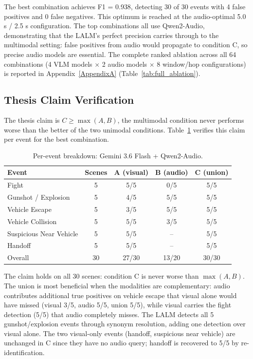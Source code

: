 The best combination achieves F1 = 0.938, detecting 30 of 30 events with 4 false positives and 0 false negatives. This optimum is reached at the audio-optimal 5.0 s / 2.5 s configuration. The top combinations all use Qwen2-Audio, demonstrating that the LALM's perfect precision carries through to the multimodal setting: false positives from audio would propagate to condition C, so precise audio models are essential. The complete ranked ablation across all 64 combinations (4 VLM models $\times$ 2 audio models $\times$ 8 window/hop configurations) is reported in Appendix~\ref{AppendixA} (Table~\ref{tab:full_ablation}).

\subsection{Thesis Claim Verification}

The thesis claim is $C \ge \max(A, B)$, the multimodal condition never performs worse than the better of the two unimodal conditions. Table~\ref{tab:thesis_claim} verifies this claim per event for the best combination.

\begin{table}[h]
  \centering
  \caption{Per-event breakdown: Gemini 3.6 Flash + Qwen2-Audio.}
  \label{tab:thesis_claim}
  \begin{tabular}{lcccc}
    \toprule
    Event & Scenes & A (visual) & B (audio) & C (union) \\
    \midrule
    Fight & 5 & 5/5 & 0/5 & 5/5 \\
    Gunshot / Explosion & 5 & 4/5 & 5/5 & 5/5 \\
    Vehicle Escape & 5 & 3/5 & 5/5 & 5/5 \\
    Vehicle Collision & 5 & 5/5 & 3/5 & 5/5 \\
     Suspicious Near Vehicle & 5 & 5/5 & -- & 5/5 \\
     Handoff & 5 & 5/5 & -- & 5/5 \\
     \midrule
     Overall & 30 & 27/30 & 13/20 & 30/30 \\
    \bottomrule
  \end{tabular}
\end{table}

The claim holds on all 30 scenes: condition C is never worse than $\max(A, B)$. The union is most beneficial when the modalities are complementary: audio contributes additional true positives on vehicle escape that visual alone would have missed (visual 3/5, audio 5/5, union 5/5), while visual carries the fight detection (5/5) that audio completely misses. The LALM detects all 5 gunshot/explosion events through synonym resolution, adding one detection over visual alone. The two visual-only events (handoff, suspicious near vehicle) are unchanged in C since they have no audio query; handoff is recovered to 5/5 by re-identification.

